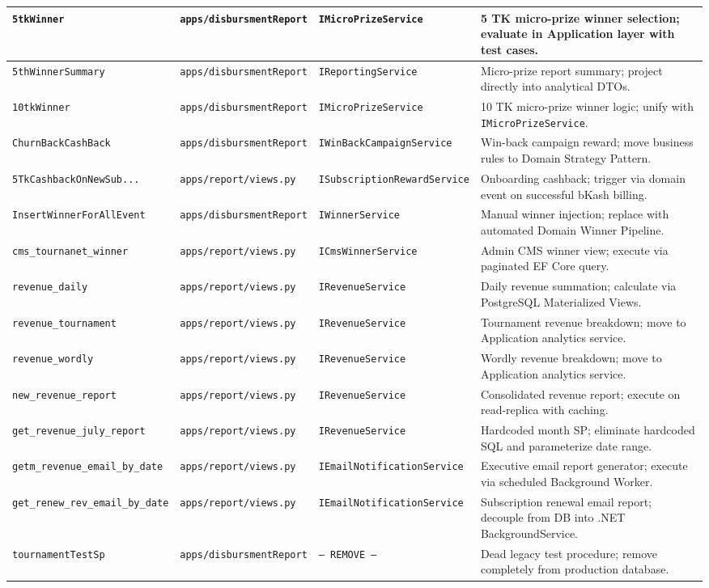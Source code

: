 {\begin{longtable}{|p{3.8cm}|p{3.2cm}|p{3.5cm}|p{3.5cm}|}
\texttt{5tkWinner} & \texttt{apps/disbursmentReport} & \texttt{IMicroPrizeService} & 5 TK micro-prize winner selection; evaluate in Application layer with test cases. \\ \hline
\texttt{5thWinnerSummary} & \texttt{apps/disbursmentReport} & \texttt{IReportingService} & Micro-prize report summary; project directly into analytical DTOs. \\ \hline
\texttt{10tkWinner} & \texttt{apps/disbursmentReport} & \texttt{IMicroPrizeService} & 10 TK micro-prize winner logic; unify with \texttt{IMicroPrizeService}. \\ \hline
\texttt{ChurnBackCashBack} & \texttt{apps/disbursmentReport} & \texttt{IWinBackCampaignService} & Win-back campaign reward; move business rules to Domain Strategy Pattern. \\ \hline
\texttt{5TkCashbackOnNewSub...} & \texttt{apps/report/views.py} & \texttt{ISubscriptionRewardService} & Onboarding cashback; trigger via domain event on successful bKash billing. \\ \hline
\texttt{InsertWinnerForAllEvent} & \texttt{apps/disbursmentReport} & \texttt{IWinnerService} & Manual winner injection; replace with automated Domain Winner Pipeline. \\ \hline
\texttt{cms\_tournanet\_winner} & \texttt{apps/report/views.py} & \texttt{ICmsWinnerService} & Admin CMS winner view; execute via paginated EF Core query. \\ \hline
\texttt{revenue\_daily} & \texttt{apps/report/views.py} & \texttt{IRevenueService} & Daily revenue summation; calculate via PostgreSQL Materialized Views. \\ \hline
\texttt{revenue\_tournament} & \texttt{apps/report/views.py} & \texttt{IRevenueService} & Tournament revenue breakdown; move to Application analytics service. \\ \hline
\texttt{revenue\_wordly} & \texttt{apps/report/views.py} & \texttt{IRevenueService} & Wordly revenue breakdown; move to Application analytics service. \\ \hline
\texttt{new\_revenue\_report} & \texttt{apps/report/views.py} & \texttt{IRevenueService} & Consolidated revenue report; execute on read-replica with caching. \\ \hline
\texttt{get\_revenue\_july\_report} & \texttt{apps/report/views.py} & \texttt{IRevenueService} & Hardcoded month SP; eliminate hardcoded SQL and parameterize date range. \\ \hline
\texttt{getm\_revenue\_email\_by\_date} & \texttt{apps/report/views.py} & \texttt{IEmailNotificationService} & Executive email report generator; execute via scheduled Background Worker. \\ \hline
\texttt{get\_renew\_rev\_email\_by\_date} & \texttt{apps/report/views.py} & \texttt{IEmailNotificationService} & Subscription renewal email report; decouple from DB into .NET BackgroundService. \\ \hline
\texttt{tournamentTestSp} & \texttt{apps/disbursmentReport} & \texttt{-- REMOVE --} & Dead legacy test procedure; remove completely from production database. \\ \hline
\end{longtable}
}

